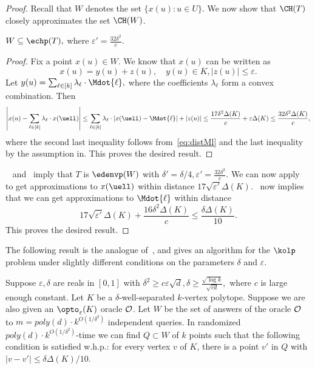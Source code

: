 \begin{proof}
Recall that $W$ denotes the set $\{x(u): u \in U\}$. We now show that $\CH(T)$ closely approximates the set $\CH(W)$. 
\begin{claim}
    \label{cl:T}
    $W \subseteq \echp(T), $ where $\varepsilon'= \frac{32 \delta^2}{c}. $
\end{claim}

\begin{proof}
    Fix a point $x(u) \in W$. We know that $x(u)$ can be written as 
    $$ x(u) = y(u) + z(u), \quad y(u) \in K, |z(u)| \leq \varepsilon.$$
    Let $y(u) = \sum_{\ell \in [k]} \lambda_{\ell} \cdot \Mdot{\ell}, $ where the coefficients $\lambda_\ell$ form a convex combination. Then 
    $$ \left|x(u) - \sum_{\ell \in [k]} \lambda_\ell \cdot x(\uell) \right| \leq \sum_{\ell \in [k]} \lambda_\ell \cdot |x(\uell) - \Mdot{\ell}| + |z(u)| \leq \frac{17 \delta^2 \Delta(K)}{c} + \varepsilon \Delta(K) \leq \frac{32 \delta^2 \Delta(K)}{c},  $$
    where the second last inequality follows from~\eqref{eq:distMl} and the last inequality by the assumption in. This proves the desired result. 
\end{proof}


~ and~ imply that $T$ is $\edenvp(W)$ with $\delta' = \delta/4, \varepsilon'= \frac{32 \delta^2}{c}$. We can now apply~ to get approximations to $x(\uell)$ within distance $17 \sqrt{\varepsilon'} \Delta(K)$.~ now implies that we can get approximations to $\Mdot{\ell}$ within distance 
$$ 17 \sqrt{\varepsilon'} \Delta(K) + \frac{16 \delta^2 \Delta(K)}{c} \leq \frac{\delta \Delta(K)}{10}.$$
This proves the desired result.
\end{proof}

The following result is the analogue of~, and gives an algorithm for the $\kolp$ problem under slightly different conditions on the parameters $\delta$ and $\varepsilon$. 

\begin{theorem}\label{upper-bound-2kolp}
Suppose $\varepsilon,\delta$ are reals in $[0,1]$ with $\delta^2\geq c\varepsilon\sqrt d, \delta \geq \frac{ \sqrt{\log k}}{\sqrt{cd}},$ where $c$ is  large enough constant.  Let $K$ be a $\delta$-well-separated $k$-vertex polytope. Suppose we are also given an $\opto_\varepsilon(K)$ oracle $\cal O$.
Let $W$ be the set of answers of the oracle $\cal O$ to $m=poly(d)\cdot k^{O(1/\delta^2)}$ independent queries.  In randomized $poly(d) \cdot k^{O(1/\delta^2)}$-time we can find $Q\subset W$ of $k$ points such that the following condition is satisfied w.h.p.:  for every vertex $v$ of $K$, there is a point $v'$ in $Q$ with $|v-v'| \leq \delta \Delta(K)/10$. 
\end{theorem}

